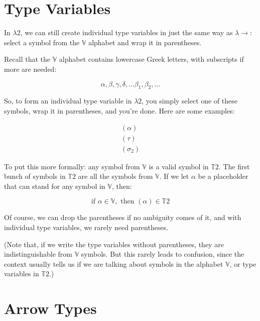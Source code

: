 \documentclass{book}
\numberwithin{equation}{chapter}
\begin{document}
\section{Type Variables}

In $\lambda 2$, we can still create individual type variables in just the same way as $\lambda \rightarrow$: select a symbol from the $\mathbb{V}$ alphabet and wrap it in parentheses.

Recall that the $\mathbb{V}$ alphabet contains lowercase Greek letters, with subscripts if more are needed:

\begin{equation}
\alpha, \beta, \gamma, \delta, \ldots \beta_{1}, \beta_{2}, \ldots
\end{equation}

\noindent
So, to form an individual type variable in $\lambda 2$, you simply select one of these symbols, wrap it in parentheses, and you're done. Here are some examples:

\begin{align}
  (\alpha) \\
  (\tau) \\
  (\sigma_{2})
\end{align}

\noindent
To put this more formally: any symbol from $\mathbb{V}$ is a valid symbol in $\mathbb{T}2$. The first bunch of symbols in $\mathbb{T}2$ are all the symbols from $\mathbb{V}$. If we let $\alpha$ be a placeholder that can stand for any symbol in $\mathbb{V}$, then:

\begin{equation}
\text{if } \alpha \in \mathbb{V}, \text{ then } (\alpha) \in \mathbb{T}2
\end{equation}

\noindent
Of course, we can drop the parentheses if no ambiguity comes of it, and with individual type variables, we rarely need parentheses.

(Note that, if we write the type variables without parentheses, they are indistinguishable from $\mathbb{V}$ symbols. But this rarely leads to confusion, since the context usually tells us if we are talking about symbols in the alphabet $\mathbb{V}$, or type variables in $\mathbb{T}2$.)


\section{Arrow Types}
\end{document}
